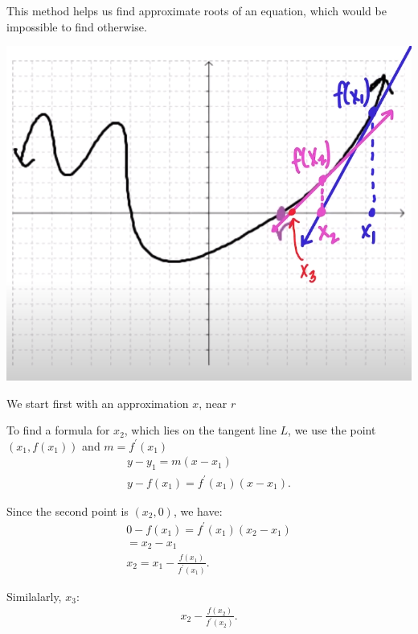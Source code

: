 \documentclass{report}
\begin{document}
  \bigbreak \noindent \bigbreak \noindent \bigbreak \noindent 
  This method helps us find approximate roots of an equation, which would be impossible to find otherwise.

  \bigbreak \noindent 
  \begin{center}
    \includegraphics[scale=0.3]{ ./images/24.png }
  \end{center}

  \bigbreak \noindent 
  We start first with an approximation $x$, near $r$

  \bigbreak \noindent 
  To find a formula for $x_2$, which lies on the tangent line $L $, we use the point $(x_1,f(x_1))$ and $m=f^{\prime}(x_1) $
  \begin{align*}
    y -y_1 = m(x-x_1) \\
    y - f(x_1) = f^{\prime}(x_1)(x-x_1)
  .\end{align*}

  \bigbreak \noindent 
  Since the second point is $(x_2, 0)$, we have:
  \begin{align*}
    0 - f(x_1) = f^{\prime}(x_1)(x_2-x_1) \\
     = x_2-x_1 \\
    x_2 = x_1 -\frac{f(x_1)}{f^{\prime}(x_1)}
  .\end{align*}

  \bigbreak \noindent \bigbreak \noindent 
  Similalarly, $x_3$:
  \begin{align*}
    x_2 - \frac{f(x_2)}{f^{\prime}(x_2)}
  .\end{align*}
\end{document}

